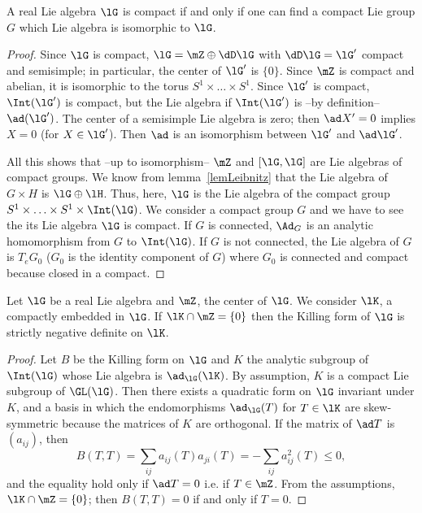 \begin{proposition}
A real Lie algebra $\lG$ is compact if and only if one can find a compact Lie group $G$ which Lie algebra is isomorphic to $\lG$.
\label{prop:alg_grp_compact}
\end{proposition}

\begin{proof}
 Since $\lG$ is compact, $\lG=\mZ\oplus\dD\lG$ with $\dD\lG=\lG'$ compact and semisimple; in particular, the center of $\lG'$ is $\{0\}$. Since $\mZ$ is compact and abelian, it is isomorphic to the torus $S^1\times\ldots\times S^1$. Since $\lG'$ is compact, $\Int(\lG')$ is compact, but the Lie algebra if $\Int(\lG')$ is --by definition--  $\ad(\lG')$. The center of a semisimple Lie algebra is zero; then $\ad X'=0$ implies $X=0$ (for $X\in\lG'$). Then $\ad$ is an isomorphism between $\lG'$ and $\ad\lG'$.

All this shows that --up to isomorphism-- $\mZ$ and $[\lG,\lG]$ are Lie algebras of compact groups. We know from lemma~\ref{lemLeibnitz} that the Lie algebra of $G\times H$ is $\lG\oplus\lH$. Thus, here, $\lG$ is the Lie algebra of the compact group $S^1\times\ldots\times S^1\times\Int(\lG)$.
We consider a compact group $G$ and we have to see the its Lie algebra $\lG$ is compact. If $G$ is connected, $\Ad_G$ is an analytic homomorphism from $G$ to $\Int(\lG)$. If $G$ is not connected, the Lie algebra of $G$ is $T_eG_0$ ($G_0$ is the identity component of $G$) where $G_0$ is connected and compact because closed in a compact.
\end{proof}

\begin{proposition}
Let $\lG$ be a real Lie algebra and $\mZ$, the center of $\lG$. We consider $\lK$, a compactly embedded in $\lG$. If $\lK\cap\mZ=\{0\}$ then the Killing form of $\lG$ is strictly negative definite on $\lK$.
\label{prop:K_Z_Killing}
\end{proposition}

\begin{proof}
Let $B$ be the Killing form on $\lG$ and $K$ the analytic subgroup of $\Int(\lG)$ whose Lie algebra is $\ad_{\lG}(\lK)$. By assumption, $K$ is a compact Lie subgroup of $\GL(\lG)$. Then there exists a quadratic form on $\lG$ invariant under $K$, and a basis in which the endomorphisms $\ad_{\lG}(T)$ for $T\in\lK$ are skew-symmetric because the matrices of $K$ are orthogonal. If the matrix of $\ad T$ is $(a_{ij})$, then
\begin{equation}
   B(T,T)=\sum_{ij}a_{ij}(T)a_{ji}(T)
         =-\sum_{ij}a_{ij}^2(T)\leq 0,
\end{equation}
and the equality hold only if $\ad T=0$ i.e. if $T\in\mZ$. From the assumptions, $\lK\cap\mZ=\{0\}$; then $B(T,T)=0$ if and only if $T=0$.
\end{proof}
